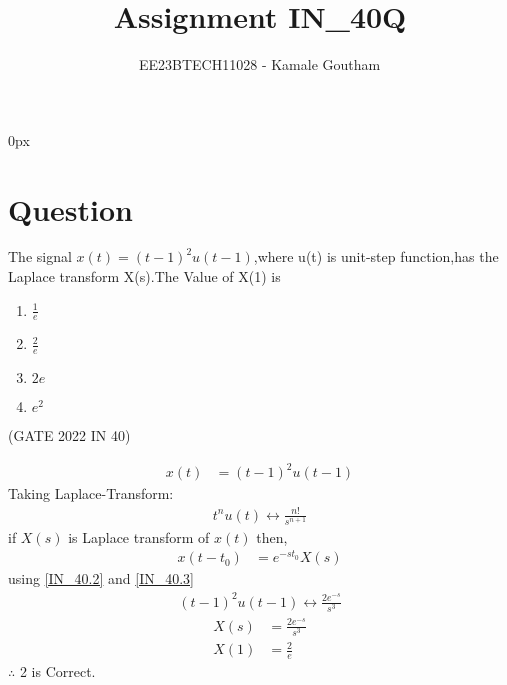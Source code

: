 \documentclass[journal,12pt,twocolumn]{IEEEtran}
\theoremstyle{remark}
\begin{document}
\parindent 0px

\title{Assignment IN\_40Q}
\author{EE23BTECH11028 - Kamale Goutham$^{}$%
}
\maketitle
\newpage
\bigskip
\section*{Question}
The signal $x(t)=(t-1)^2u(t-1)$,where u(t) is unit-step function,has the Laplace transform X(s).The Value of X(1) is 
\begin{enumerate}
    \item $\frac{1}{e}$
    \item $\frac{2}{e}$
    \item $2e$
    \item $e^2$
\end{enumerate}
\hfill{(GATE 2022 IN 40)}\\
\solution

\begin{align}
    x(t)&=(t-1)^2u(t-1) 
\end{align}
  Taking Laplace-Transform:\\
\begin{align}
    t^nu(t) \leftrightarrow \frac{n!}{s^{n+1}} \label{IN_40.2}
\end{align}
if $X(s)$ is Laplace transform of $x(t)$ then,\\
\begin{align}
  x(t-t_0)&=e^{-st_0}X(s)\label{IN_40.3}
\end{align}
using \ref{IN_40.2} and \ref{IN_40.3}\\
\begin{align}
    (t-1)^2u(t-1) \leftrightarrow \frac{2e^{-s}}{s^3}
\end{align}
\begin{align}
    X(s)&=\frac{2e^{-s}}{s^3}\\
    X(1)&=\frac{2}{e}
\end{align}
$\therefore$ 2 is Correct.
\end{document}
